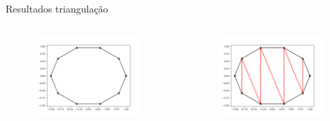 \documentclass[aspectratio=169,usenames,dvipsnames]{beamer}
\begin{document}
\begin{frame}{Resultados triangulação}
  \begin{columns}
    \begin{center}
      \begin{figure}
        \includegraphics[width=0.95\textwidth]{figures/regular_10.png}
      \end{figure}
    \end{center}
    \begin{center}
      \begin{figure}
        \includegraphics[width=0.95\textwidth]{figures/regular_10_trig.png}
      \end{figure}
    \end{center}
  \end{columns}
\end{frame}
\end{document}
